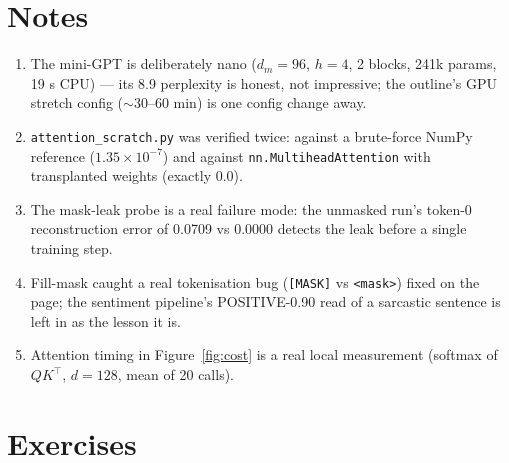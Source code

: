 \section*{Notes}
\begin{enumerate}
\item[\textbf{1.}] The mini-GPT is deliberately nano ($d_m{=}96$,
$h{=}4$, 2 blocks, 241k params, 19 s CPU) --- its 8.9 perplexity is
honest, not impressive; the outline's GPU stretch config ($\sim$30--60
min) is one config change away.
\item[\textbf{2.}] \texttt{attention\_scratch.py} was verified twice:
against a brute-force NumPy reference ($1.35\times10^{-7}$) and
against \texttt{nn.MultiheadAttention} with transplanted weights
(exactly 0.0).
\item[\textbf{3.}] The mask-leak probe is a real failure mode: the
unmasked run's token-0 reconstruction error of 0.0709 vs 0.0000
detects the leak before a single training step.
\item[\textbf{4.}] Fill-mask caught a real tokenisation bug
(\texttt{[MASK]} vs \texttt{<mask>}) fixed on the page; the
sentiment pipeline's POSITIVE-0.90 read of a sarcastic sentence is
left in as the lesson it is.
\item[\textbf{5.}] Attention timing in Figure~\ref{fig:cost} is a
real local measurement (softmax of $QK^\top$, $d{=}128$, mean of 20
calls).
\end{enumerate}

\section{Exercises}
\label{sec:attnexercises}

